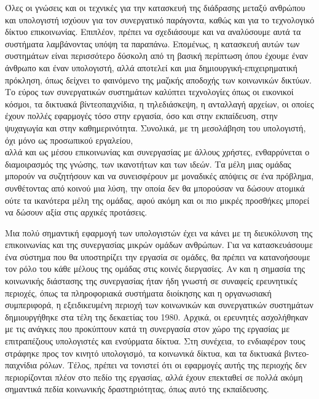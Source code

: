 \documentclass[
]{article}
\begin{document}
Όλες οι γνώσεις και οι τεχνικές για την κατασκευή της διάδρασης μεταξύ
ανθρώπου και υπολογιστή ισχύουν για τον συνεργατικό παράγοντα, καθώς και
για το τεχνολογικό δίκτυο επικοινωνίας. Επιπλέον, πρέπει να σχεδιάσουμε
και να αναλύσουμε αυτά τα συστήματα λαμβάνοντας υπόψη τα παραπάνω.
Επομένως, η κατασκευή αυτών των συστημάτων είναι περισσότερο δύσκολη από
τη βασική περίπτωση όπου έχουμε έναν άνθρωπο και έναν υπολογιστή, αλλά
αποτελεί και μια δημιουργική-επιχειρηματική πρόκληση, όπως δείχνει το
φαινόμενο της μαζικής αποδοχής των κοινωνικών δικτύων. Το εύρος των
συνεργατικών συστημάτων καλύπτει τεχνολογίες όπως οι εικονικοί κόσμοι,
τα δικτυακά βίντεοπαιχνίδια, η τηλεδιάσκεψη, η ανταλλαγή αρχείων, οι
οποίες έχουν πολλές εφαρμογές τόσο στην εργασία, όσο και στην
εκπαίδευση, στην ψυχαγωγία και στην καθημερινότητα. Συνολικά, με τη
μεσολάβηση του υπολογιστή, όχι μόνο ως προσωπικού εργαλείου,\\
αλλά και ως μέσου επικοινωνίας και συνεργασίας με άλλους χρήστες,
ενθαρρύνεται ο διαμοιρασμός της γνώσης, των ικανοτήτων και των ιδεών. Τα
μέλη μιας ομάδας μπορούν να συζητήσουν και να συνεισφέρουν με μοναδικές
απόψεις σε ένα πρόβλημα, συνθέτοντας από κοινού μια λύση, την οποία δεν
θα μπορούσαν να δώσουν ατομικά ούτε τα ικανότερα μέλη της ομάδας, αφού
ακόμη και οι πιο μικρές προσθήκες μπορεί να δώσουν αξία στις αρχικές
προτάσεις.

Μια πολύ σημαντική εφαρμογή των υπολογιστών έχει να κάνει με τη
διευκόλυνση της επικοινωνίας και της συνεργασίας μικρών ομάδων ανθρώπων.
Για να κατασκευάσουμε ένα σύστημα που θα υποστηρίζει την εργασία σε
ομάδες, θα πρέπει να κατανοήσουμε τον ρόλο του κάθε μέλους της ομάδας
στις κοινές διεργασίες. Αν και η σημασία της κοινωνικής διάστασης της
συνεργασίας ήταν ήδη γνωστή σε συναφείς ερευνητικές περιοχές, όπως τα
πληροφοριακά συστήματα διοίκησης και η οργανωσιακή συμπεριφορά, η
εξειδικευμένη περιοχή των κοινωνικών και συνεργατικών συστημάτων
δημιουργήθηκε στα τέλη της δεκαετίας του 1980. Αρχικά, οι ερευνητές
ασχολήθηκαν με τις ανάγκες που προκύπτουν κατά τη συνεργασία στον χώρο
της εργασίας με επιτραπέζιους υπολογιστές και ενσύρματα δίκτυα. Στη
συνέχεια, το ενδιαφέρον τους στράφηκε προς τον κινητό υπολογισμό, τα
κοινωνικά δίκτυα, και τα δικτυακά βιντεο-παιχνίδια ρόλων. Τέλος, πρέπει
να τονιστεί ότι οι εφαρμογές αυτής της περιοχής δεν περιορίζονται πλέον
στο πεδίο της εργασίας, αλλά έχουν επεκταθεί σε πολλά ακόμη σημαντικά
πεδία κοινωνικής δραστηριότητας, όπως αυτό της εκπαίδευσης.
\end{document}
